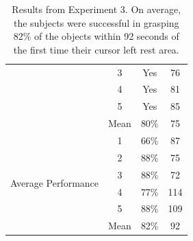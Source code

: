 \begin{table}[t]
\begin{minipage}[!t]{.5\columnwidth}
\begin{tabular}[t!]{ | c c c c | }
 &3 & Yes & 76 \\
 &4 & Yes & 81 \\
 &5 & Yes & 85 \\ 
 & Mean & 80\% & 75\\\hline 
 \multirow{6}{*}{\begin{minipage}[t]{0.24\columnwidth}Average Performance\end{minipage}} & 1 & 66\% & 87 \\
 &2 & 88\% & 75 \\
 &3 & 88\% & 72 \\
 &4 & 77\% & 114 \\
 &5 & 88\% &  109\\ 
 & Mean & 82\% & 92\\\hline 
 \end{tabular}
 \end{minipage}

 \caption{Results from Experiment 3. On average, the subjects were successful in grasping 82\% of the objects within 92 seconds of the first time their cursor left rest area.}
 \label{tab:results_3}
 
 \end{table}
%
